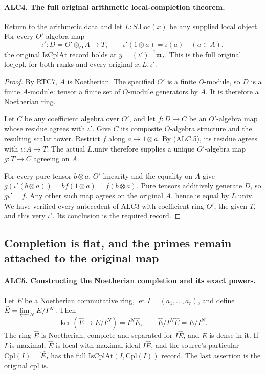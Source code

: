 \documentclass[11pt,a4paper]{article}
\numberwithin{equation}{section}
\theoremstyle{remark}\newtheorem{remark}[theorem]{Remark}
\begin{document}
\paragraph{ALC4. The full original arithmetic local-completion theorem.}
\label{claim:ALC4}
Return to the arithmetic data and let \(L:S.\mathrm{Loc}(x)\)
be any supplied local object.  For every \(O'\)-algebra map
\[
 \iota':D=O'\otimes_OA\longrightarrow T,
 \qquad \iota'(1\otimes a)=\iota(a)\quad(a\in A),
                                                        \tag{ALC.5}
\]
the original \(\mathrm{IsCplAt}\) record holds at
\(y=(\iota')^{-1}\mathfrak m_T\).  This is the full
original \(\mathrm{loc\_\allowbreak cpl}\), for both ranks and every
original \(x,L,\iota'\).

\begin{proof}
By RTC7, \(A\) is Noetherian.  The specified \(O'\) is a
finite \(O\)-module, so \(D\) is a finite \(A\)-module:
tensor a finite set of \(O\)-module generators by \(A\).
It is therefore a Noetherian ring.

Let \(C\) be any coefficient algebra over \(O'\), and let
\(f:D\to C\) be an \(O'\)-algebra map whose residue agrees
with \(\iota'\).  Give \(C\) its composite \(O\)-algebra
structure and the resulting scalar tower.  Restrict \(f\)
along \(a\mapsto1\otimes a\).  By (ALC.5), its residue
agrees with \(\iota:A\to T\).  The actual \(L.\mathrm{univ}\)
therefore supplies a unique \(O'\)-algebra map \(g:T\to C\)
agreeing on \(A\).

For every pure tensor \(b\otimes a\), \(O'\)-linearity
and the equality on \(A\) give
\(g(\iota'(b\otimes a))=b f(1\otimes a)=f(b\otimes a)\).
Pure tensors additively generate \(D\), so \(g\iota'=f\).
Any other such map agrees on the original \(A\), hence is
equal by \(L.\mathrm{univ}\).  We have verified every
antecedent of ALC3 with coefficient ring \(O'\), the given
\(T\), and this very \(\iota'\).  Its conclusion is the
required record.
\end{proof}

\subsection{Completion is flat, and the primes remain attached to the original map}

\paragraph{ALC5. Constructing the Noetherian completion and its exact powers.}
\label{claim:ALC5}
Let \(E\) be a Noetherian commutative ring, let
\(I=(a_1,\ldots,a_r)\), and define
\(\widehat E=\varprojlim_N E/I^N\).  Then
\[
 \ker(\widehat E\to E/I^N)=I^N\widehat E,
 \qquad \widehat E/I^N\widehat E=E/I^N.          \tag{ALC.6}
\]
The ring \(\widehat E\) is Noetherian, complete and separated
for \(I\widehat E\), and \(E\) is dense in it.  If \(I\)
is maximal, \(\widehat E\) is local with maximal ideal
\(I\widehat E\), and the source's particular
\(\mathrm{Cpl}(I)=\widehat{E_I}\) has the full
\(\mathrm{IsCplAt}(I,\mathrm{Cpl}(I))\) record.  The last
assertion is the original \(\mathrm{cpl\_\allowbreak is}\).
\end{document}
